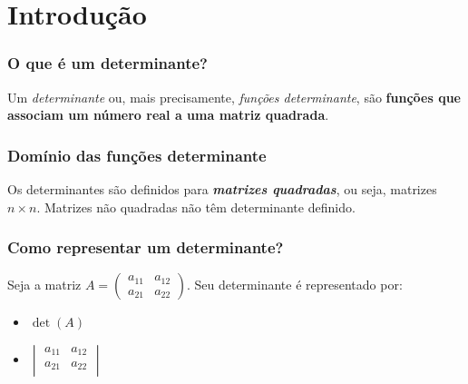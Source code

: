 \documentclass[pdftex, brazil, aspectratio=169]{beamer}
\begin{document}
\section{Introdução}

\begin{frame}[t]
  \frametitle{O que é um determinante?}
  Um \emph{determinante} ou, mais precisamente, \emph{funções determinante}, são
  \textbf{funções que associam um número real a uma matriz quadrada}.
\end{frame}

\begin{frame}[t]
  \frametitle{Domínio das funções determinante}
  Os determinantes são definidos para \emph{\textbf{matrizes quadradas}}, ou
  seja, matrizes $n \times n$. Matrizes não quadradas não têm determinante
  definido.
\end{frame}

\begin{frame}[t]
  \frametitle{Como representar um determinante?}
  Seja a matriz $A = \begin{pmatrix}
a_{11} & a_{12}\\
a_{21} & a_{22}\end{pmatrix}$. Seu determinante é representado por:
  \vspace{1cm}
  \begin{itemize}
    \item $\det(A)$
    \vspace{0.5cm}
    \item $\begin{vmatrix}
      a_{11} & a_{12}\\
      a_{21} & a_{22}\\
      \end{vmatrix}$
  \end{itemize}
\end{frame}
\end{document}
